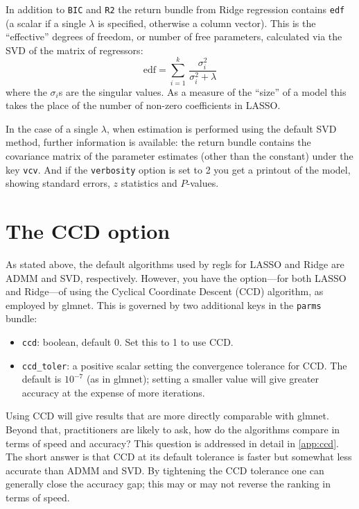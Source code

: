 \documentclass{article}
\begin{document}
In addition to \texttt{BIC} and \texttt{R2} the return bundle from
Ridge regression contains \texttt{edf} (a scalar if a single $\lambda$
is specified, otherwise a column vector). This is the ``effective''
degrees of freedom, or number of free parameters, calculated via
the SVD of the matrix of regressors:
\begin{equation}
  \label{eq:edf}
\mbox{edf} = \sum_{i=1}^k\, \frac{\sigma_i^2}{\sigma_i^2 + \lambda}
\end{equation}
where the $\sigma_i$s are the singular values. As a measure of the
``size'' of a model this takes the place of the number of non-zero
coefficients in LASSO.

In the case of a single $\lambda$, when estimation is performed using
the default SVD method, further information is available: the return
bundle contains the covariance matrix of the parameter estimates
(other than the constant) under the key \texttt{vcv}. And if the
\texttt{verbosity} option is set to 2 you get a printout of the model,
showing standard errors, $z$ statistics and $P$-values.

\section{The CCD option}
\label{sec:ccd}

As stated above, the default algorithms used by \textsf{regls} for
LASSO and Ridge are ADMM and SVD, respectively. However, you have the
option---for both LASSO and Ridge---of using the Cyclical Coordinate
Descent (CCD) algorithm, as employed by \textsf{glmnet}. This is
governed by two additional keys in the \texttt{parms} bundle:
\begin{itemize}
\item \texttt{ccd}: boolean, default 0. Set this to 1 to use CCD.
\item \texttt{ccd\_toler}: a positive scalar setting the convergence
  tolerance for CCD. The default is $10^{-7}$ (as in \textsf{glmnet});
  setting a smaller value will give greater accuracy at the expense of
  more iterations.
\end{itemize}

Using CCD will give results that are more directly comparable with
\textsf{glmnet}. Beyond that, practitioners are likely to ask, how do
the algorithms compare in terms of speed and accuracy? This question
is addressed in detail in \ref{app:ccd}. The short answer
is that CCD at its default tolerance is faster but somewhat less
accurate than ADMM and SVD. By tightening the CCD tolerance one can
generally close the accuracy gap; this may or may not reverse the
ranking in terms of speed.
\end{document}

